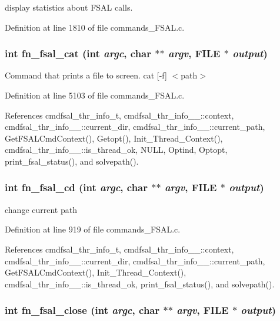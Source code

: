 display statistics about FSAL calls. 

Definition at line 1810 of file commands\_\-FSAL.c.
\subsubsection{\setlength{\rightskip}{0pt plus 5cm}int fn\_\-fsal\_\-cat (int {\em argc}, char $\ast$$\ast$ {\em argv}, FILE $\ast$ {\em output})}\label{commands_8h_a29}


Command that prints a file to screen. cat [-f] $<$path$>$ 

Definition at line 5103 of file commands\_\-FSAL.c.

References cmdfsal\_\-thr\_\-info\_\-t, cmdfsal\_\-thr\_\-info\_\-\_\-::context, cmdfsal\_\-thr\_\-info\_\-\_\-::current\_\-dir, cmdfsal\_\-thr\_\-info\_\-\_\-::current\_\-path, Get\-FSALCmd\-Context(), Getopt(), Init\_\-Thread\_\-Context(), cmdfsal\_\-thr\_\-info\_\-\_\-::is\_\-thread\_\-ok, NULL, Optind, Optopt, print\_\-fsal\_\-status(), and solvepath().
\subsubsection{\setlength{\rightskip}{0pt plus 5cm}int fn\_\-fsal\_\-cd (int {\em argc}, char $\ast$$\ast$ {\em argv}, FILE $\ast$ {\em output})}\label{commands_8h_a8}


change current path 

Definition at line 919 of file commands\_\-FSAL.c.

References cmdfsal\_\-thr\_\-info\_\-t, cmdfsal\_\-thr\_\-info\_\-\_\-::context, cmdfsal\_\-thr\_\-info\_\-\_\-::current\_\-dir, cmdfsal\_\-thr\_\-info\_\-\_\-::current\_\-path, Get\-FSALCmd\-Context(), Init\_\-Thread\_\-Context(), cmdfsal\_\-thr\_\-info\_\-\_\-::is\_\-thread\_\-ok, print\_\-fsal\_\-status(), and solvepath().
\subsubsection{\setlength{\rightskip}{0pt plus 5cm}int fn\_\-fsal\_\-close (int {\em argc}, char $\ast$$\ast$ {\em argv}, FILE $\ast$ {\em output})}\label{commands_8h_a27}


